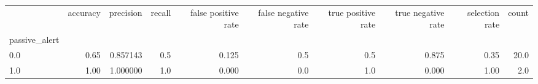 \begin{tabular}{lrrrrrrrrr}
\toprule
{} &  accuracy &  precision &  recall &  false positive rate &  false negative rate &  true positive rate &  true negative rate &  selection rate &  count \\
passive\_alert &           &            &         &                      &                      &                     &                     &                 &        \\
\midrule
0.0           &      0.65 &   0.857143 &     0.5 &                0.125 &                  0.5 &                 0.5 &               0.875 &            0.35 &   20.0 \\
1.0           &      1.00 &   1.000000 &     1.0 &                0.000 &                  0.0 &                 1.0 &               0.000 &            1.00 &    2.0 \\
\bottomrule
\end{tabular}
